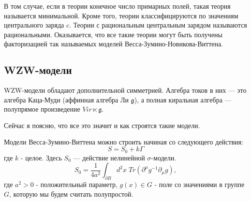 \documentclass[a4paper,12pt]{article}
\theoremstyle{definition} \newtheorem{Def}{Definition}
\begin{document}
В том случае, если в теории конечное число примарных полей, такая теория называется минимальной.
Кроме того, теории классифицируются по значениям центрального заряда $c$. Теории с рациональным
центральным зарядом называются рациональными. Оказывается, что все такие теории могут быть получены
факторизацией так называемых моделей Весса-Зумино-Новикова-Виттена.

\subsection{WZW-модели}
\label{sec:wzw}

WZW-модели обладают дополнительной симметрией. Алгебра токов в них --- это алгебра Каца-Муди
(аффинная алгебра Ли $\mathfrak{g}$), а полная киральная алгебра --- полупрямое произведение
$Vir\ltimes \mathfrak{g}$. 

Сейчас я поясню, что все это значит и как строятся такие модели.

Модели Весса-Зумино-Виттена можно строить начиная со следующего действия:
\begin{equation}
\label{eq:4}
  S=S_0+k\Gamma
\end{equation}
где $k$ - целое.
Здесь $S_0$ --- действие нелинейной $\sigma$-модели.
\begin{equation}
  \label{eq:5}
  S_0=\frac{1}{4a^2}\int_{\partial B} d^2x\; Tr (\partial^{\mu}g^{-1}\partial_{\mu}g),
\end{equation}
где $a^2>0$ - положительный параметр, $g(x)\in G$ - поле со значениями в группе $G$, которую мы
будем считать полупростой. 
\end{document}
